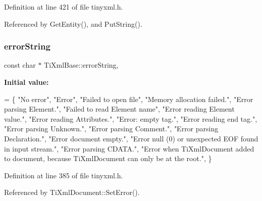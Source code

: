Definition at line 421 of file tinyxml.\+h.



Referenced by Get\+Entity(), and Put\+String().

\hypertarget{class_ti_xml_base_a7ac8feec4100e446b3d78e1ac0659700}{}\label{class_ti_xml_base_a7ac8feec4100e446b3d78e1ac0659700} 
\subsubsection{\texorpdfstring{error\+String}{errorString}}
{\footnotesize\ttfamily const char $\ast$ Ti\+Xml\+Base\+::error\+String\hspace{0.3cm}{\ttfamily [static]}, {\ttfamily [protected]}}

{\bfseries Initial value\+:}
\begin{DoxyCode}
=
  \{
    \textcolor{stringliteral}{"No error"},
    \textcolor{stringliteral}{"Error"},
    \textcolor{stringliteral}{"Failed to open file"},
    \textcolor{stringliteral}{"Memory allocation failed."},
    \textcolor{stringliteral}{"Error parsing Element."},
    \textcolor{stringliteral}{"Failed to read Element name"},
    \textcolor{stringliteral}{"Error reading Element value."},
    \textcolor{stringliteral}{"Error reading Attributes."},
    \textcolor{stringliteral}{"Error: empty tag."},
    \textcolor{stringliteral}{"Error reading end tag."},
    \textcolor{stringliteral}{"Error parsing Unknown."},
    \textcolor{stringliteral}{"Error parsing Comment."},
    \textcolor{stringliteral}{"Error parsing Declaration."},
    \textcolor{stringliteral}{"Error document empty."},
    \textcolor{stringliteral}{"Error null (0) or unexpected EOF found in input stream."},
    \textcolor{stringliteral}{"Error parsing CDATA."},
    \textcolor{stringliteral}{"Error when TiXmlDocument added to document, because TiXmlDocument can only be at the root."},
  \}
\end{DoxyCode}


Definition at line 385 of file tinyxml.\+h.



Referenced by Ti\+Xml\+Document\+::\+Set\+Error().

\hypertarget{class_ti_xml_base_a0d992580f3bc264909f898e942677a3c}{}\label{class_ti_xml_base_a0d992580f3bc264909f898e942677a3c} 
